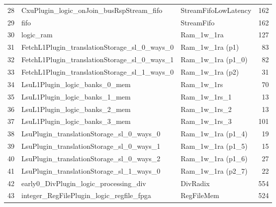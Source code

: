 \begin{table}[!htbp]
\begin{tabular}{rllr}
28 & \quad\quad\quad CxuPlugin\_logic\_onJoin\_busRspStream\_fifo        & StreamFifoLowLatency                             &    162 \\
29 & \quad\quad\quad\quad fifo                                           & StreamFifo                                       &    162 \\
30 & \quad\quad\quad\quad\quad logic\_ram                                & Ram\_1w\_1ra                                     &    127 \\
31 & \quad\quad\quad FetchL1Plugin\_translationStorage\_sl\_0\_ways\_0   & Ram\_1w\_1ra (p1)                                &     83 \\
32 & \quad\quad\quad FetchL1Plugin\_translationStorage\_sl\_0\_ways\_1   & Ram\_1w\_1ra (p1\_0)                             &     82 \\
33 & \quad\quad\quad FetchL1Plugin\_translationStorage\_sl\_1\_ways\_0   & Ram\_1w\_1ra (p2)                                &     31 \\
34 & \quad\quad\quad LsuL1Plugin\_logic\_banks\_0\_mem                   & Ram\_1w\_1rs                                     &     70 \\
35 & \quad\quad\quad LsuL1Plugin\_logic\_banks\_1\_mem                   & Ram\_1w\_1rs\_1                                  &     13 \\
36 & \quad\quad\quad LsuL1Plugin\_logic\_banks\_2\_mem                   & Ram\_1w\_1rs\_2                                  &     13 \\
37 & \quad\quad\quad LsuL1Plugin\_logic\_banks\_3\_mem                   & Ram\_1w\_1rs\_3                                  &    101 \\
38 & \quad\quad\quad LsuPlugin\_translationStorage\_sl\_0\_ways\_0       & Ram\_1w\_1ra (p1\_4)                             &     19 \\
39 & \quad\quad\quad LsuPlugin\_translationStorage\_sl\_0\_ways\_1       & Ram\_1w\_1ra (p1\_5)                             &     15 \\
40 & \quad\quad\quad LsuPlugin\_translationStorage\_sl\_0\_ways\_2       & Ram\_1w\_1ra (p1\_6)                             &     27 \\
41 & \quad\quad\quad LsuPlugin\_translationStorage\_sl\_1\_ways\_0       & Ram\_1w\_1ra (p2\_7)                             &     22 \\
42 & \quad\quad\quad early0\_DivPlugin\_logic\_processing\_div           & DivRadix                                         &    554 \\
43 & \quad\quad\quad integer\_RegFilePlugin\_logic\_regfile\_fpga        & RegFileMem                                       &    524 \\
\bottomrule
\end{tabular}
\end{table}
